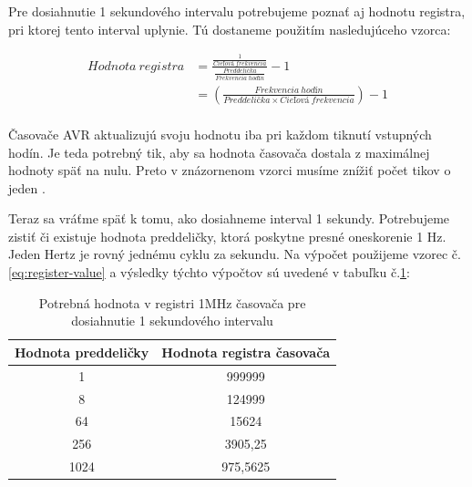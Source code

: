 Pre dosiahnutie 1 sekundového intervalu potrebujeme poznať aj hodnotu registra,
pri ktorej tento interval uplynie. Tú dostaneme použitím nasledujúceho vzorca:

\begin{equation} \label{eq:register-value}
    \begin{aligned}
        Hodnota\:registra & = \frac{ \frac{1}{Cieľová\:frekvencia}} { \frac{Preddelička}{Frekvencia\:hodín}} - 1 \\
                          & = (\frac{Frekvencia\:hodín}{Preddelička \times Cieľová\:frekvencia}) - 1             \\
    \end{aligned}
\end{equation}

Časovače AVR aktualizujú svoju hodnotu iba pri každom tiknutí vstupných hodín.
Je teda potrebný tik, aby sa hodnota časovača dostala z maximálnej hodnoty späť na nulu. Preto v znázornenom vzorci
musíme znížiť počet tikov o jeden \cite{atmelATmega64012801281}. \par

Teraz sa vráťme späť k tomu, ako dosiahneme interval 1 sekundy.
Potrebujeme zistiť či existuje hodnota preddeličky, ktorá poskytne presné oneskorenie 1 \acrshort{Hz}. Jeden Hertz je rovný jednému cyklu za sekundu. Na výpočet použijeme vzorec
č.\ref{eq:register-value} a výsledky týchto výpočtov sú uvedené v tabuľku č.\ref{table:timerPrescalerValues}:

\begin{table}[!htbp]
    \begin{center}
        \begin{tabular}{|c|c|}
            \hline
            Hodnota preddeličky & Hodnota registra časovača \\
            \hline
            1                   & 999999                    \\
            8                   & 124999                    \\
            64                  & 15624                     \\
            256                 & 3905,25                   \\
            1024                & 975,5625                  \\
            \hline
        \end{tabular}
        \caption{Potrebná hodnota v registri 1MHz časovača pre dosiahnutie 1 sekundového intervalu}
        \label{table:timerPrescalerValues}
    \end{center}
\end{table}

